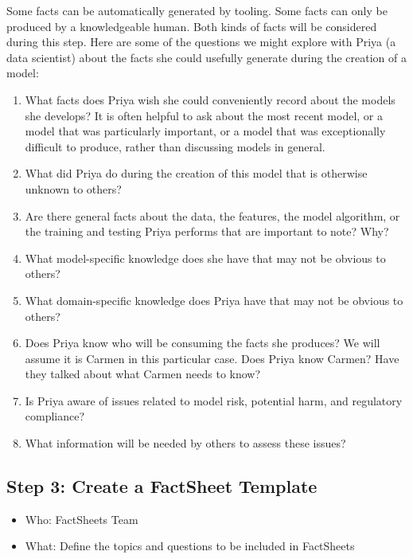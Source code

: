 \documentclass[11pt,dvipdfm]{article}
\begin{document}
Some facts can be automatically generated by tooling. Some facts can only be produced by a knowledgeable human. Both kinds of facts will be considered during this step. Here are some of the questions we might explore with Priya (a data scientist) about the facts she could usefully generate during the creation of a model:\\

\begin{enumerate}
\item What facts does Priya wish she could conveniently record about the models she develops? It is often helpful to ask about the most recent model, or a model that was particularly important, or a model that was exceptionally difficult to produce, rather than discussing models in general.
\item What did Priya do during the creation of this model that is otherwise unknown to others?
\item Are there general facts about the data, the features, the model algorithm, or the training and testing Priya performs that are important to note? Why?
\item What model-specific knowledge does she have that may not be obvious to others?
\item What domain-specific knowledge does Priya have that may not be obvious to others?
\item Does Priya know who will be consuming the facts she produces? We will assume it is Carmen in this particular case. Does Priya know Carmen? Have they talked about what Carmen needs to know?
\item Is Priya aware of issues related to model risk, potential harm, and regulatory compliance?
\item What information will be needed by others to assess these issues?
\end{enumerate}
\hspace{.2cm}

\subsection{Step 3: Create a FactSheet Template}

\begin{itemize}[noitemsep,nolistsep]
    \item Who: FactSheets Team
    \item What: Define the topics and questions to be included in FactSheets
\end{itemize}
\hspace{.2cm}
\end{document}

